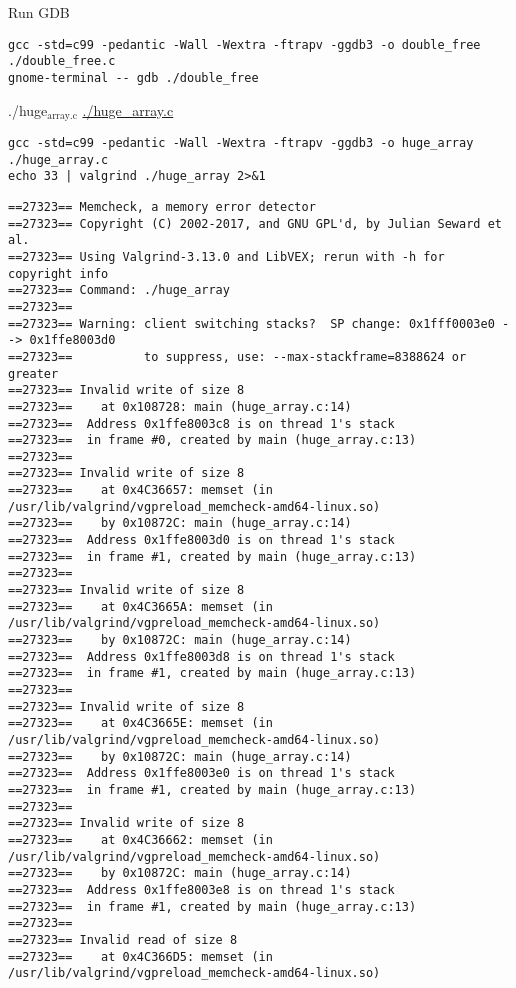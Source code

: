 \documentclass[11pt]{article}
\begin{document}
Run GDB
\begin{verbatim}
gcc -std=c99 -pedantic -Wall -Wextra -ftrapv -ggdb3 -o double_free ./double_free.c
gnome-terminal -- gdb ./double_free
\end{verbatim}

\item ./huge\(_{\text{array.c}}\)
\label{sec:orgc351a52}
\url{./huge\_array.c}

\begin{verbatim}
gcc -std=c99 -pedantic -Wall -Wextra -ftrapv -ggdb3 -o huge_array ./huge_array.c
echo 33 | valgrind ./huge_array 2>&1
\end{verbatim}

\begin{verbatim}
==27323== Memcheck, a memory error detector
==27323== Copyright (C) 2002-2017, and GNU GPL'd, by Julian Seward et al.
==27323== Using Valgrind-3.13.0 and LibVEX; rerun with -h for copyright info
==27323== Command: ./huge_array
==27323== 
==27323== Warning: client switching stacks?  SP change: 0x1fff0003e0 --> 0x1ffe8003d0
==27323==          to suppress, use: --max-stackframe=8388624 or greater
==27323== Invalid write of size 8
==27323==    at 0x108728: main (huge_array.c:14)
==27323==  Address 0x1ffe8003c8 is on thread 1's stack
==27323==  in frame #0, created by main (huge_array.c:13)
==27323== 
==27323== Invalid write of size 8
==27323==    at 0x4C36657: memset (in /usr/lib/valgrind/vgpreload_memcheck-amd64-linux.so)
==27323==    by 0x10872C: main (huge_array.c:14)
==27323==  Address 0x1ffe8003d0 is on thread 1's stack
==27323==  in frame #1, created by main (huge_array.c:13)
==27323== 
==27323== Invalid write of size 8
==27323==    at 0x4C3665A: memset (in /usr/lib/valgrind/vgpreload_memcheck-amd64-linux.so)
==27323==    by 0x10872C: main (huge_array.c:14)
==27323==  Address 0x1ffe8003d8 is on thread 1's stack
==27323==  in frame #1, created by main (huge_array.c:13)
==27323== 
==27323== Invalid write of size 8
==27323==    at 0x4C3665E: memset (in /usr/lib/valgrind/vgpreload_memcheck-amd64-linux.so)
==27323==    by 0x10872C: main (huge_array.c:14)
==27323==  Address 0x1ffe8003e0 is on thread 1's stack
==27323==  in frame #1, created by main (huge_array.c:13)
==27323== 
==27323== Invalid write of size 8
==27323==    at 0x4C36662: memset (in /usr/lib/valgrind/vgpreload_memcheck-amd64-linux.so)
==27323==    by 0x10872C: main (huge_array.c:14)
==27323==  Address 0x1ffe8003e8 is on thread 1's stack
==27323==  in frame #1, created by main (huge_array.c:13)
==27323== 
==27323== Invalid read of size 8
==27323==    at 0x4C366D5: memset (in /usr/lib/valgrind/vgpreload_memcheck-amd64-linux.so)

\end{verbatim}
\end{document}
